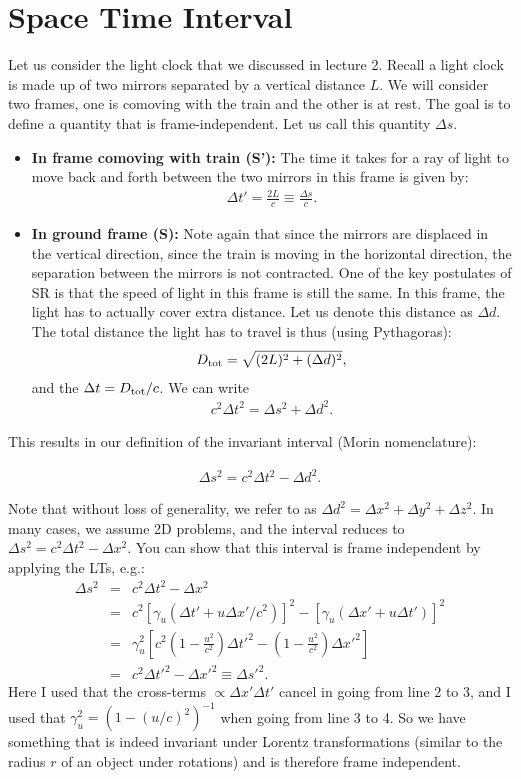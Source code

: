 \documentclass[12pt]{article}
\newcommand{\be}{\begin{eqnarray}}
\newcommand{\ee}{\end{eqnarray}}
\begin{document}
\section{Space Time Interval}\label{sec:S}
Let us consider the light clock that we discussed in lecture 2. Recall a light clock is made up of two mirrors separated by a vertical distance $L$. We will consider two frames, one is comoving with the train and the other is at rest. The goal is to define a quantity that is frame-independent. Let us call this quantity $\Delta s$.
\begin{itemize}
\item \textbf{In frame comoving with train (S'):}
The time it takes for a ray of light to move back and forth between the two mirrors in this frame is given by:
\be
\Delta t' = \frac{2L}{c} \equiv \frac{ \Delta s}{c}.
\ee

\noindent

\item \textbf{In ground frame (S):} Note again that since the mirrors are displaced in the vertical direction, since the train is moving in the horizontal direction, the separation between the mirrors is not contracted. One of the key postulates of SR is that the speed of light in this frame is still the same. In this frame, the light has to actually cover extra distance. Let us denote this distance as $\Delta d$. The total distance the light has to travel is thus (using Pythagoras):
\be
D_{\rm tot} =\sqrt{(2L)^2 + (\Delta d)^2},
\ee
and the $\Delta t = D_{\rm tot}/c$. We can write
\be
c^2\Delta t^2 = \Delta s^2 + \Delta d^2.
\ee
\end{itemize}
This results in our definition of the invariant interval (Morin nomenclature):
\begin{tcolorbox}[colback=blue!5!white]
\vspace{-1.3em}
\be
\Delta s^2  = c^2 \Delta t^2 - \Delta d^2 \label{eq:SI}.
\ee
\end{tcolorbox}
Note that without loss of generality, we refer to as $\Delta d^2 = \Delta x^2 + \Delta y^2 + \Delta z^2$. In many cases, we assume 2D problems, and the interval reduces to $\Delta s^2 = c^2\Delta t^2 - \Delta x^2$. You can show that this interval is frame independent by applying the LTs, e.g.:
\be
\Delta s^2  &=& c^2 \Delta t^2 - \Delta x^2 \nonumber \\
            &=& c^2 \left[\gamma_u (\Delta t' + u \Delta x'/c^2)\right]^2 - \left[\gamma_u (\Delta x' + u\Delta t')\right]^2 \nonumber \\
            &=& \gamma_u^2 \left[c^2(1-\frac{u^2}{c^2}) \Delta t'^2 -(1-\frac{u^2}{c^2})\Delta x'^2\right] \nonumber \\
            &=& c^2 \Delta t'^2 -\Delta x'^2 \equiv \Delta s'^2.
\ee
Here I used that the cross-terms $\propto \Delta x' \Delta t'$ cancel in going from line 2 to 3, and I used that $\gamma_u^2 = (1-(u/c)^2)^{-1}$ when going from line 3 to 4. So we have something that is indeed invariant under Lorentz transformations (similar to the radius $r$ of an object under rotations) and is therefore frame independent. \\
\end{document}
